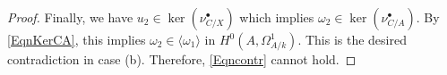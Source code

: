 \begin{proof}

Finally, we have $u_2\in \ker (\nu_{C/X}^\bullet)$ which implies $\omega_2\in \ker (\nu_{C/A}^\bullet)$. By \eqref{EqnKerCA}, this implies $\omega_2\in \langle \omega_1\rangle$ in $H^0(A,\Omega^1_{A/k})$. This is the desired contradiction in case (b). Therefore, \eqref{Eqncontr} cannot hold.
\end{proof}







